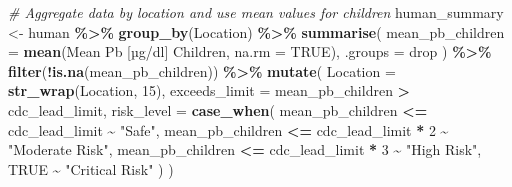 \documentclass[
]{article}
\newenvironment{Shaded}{\begin{snugshade}}{\end{snugshade}}
\newcommand{\AttributeTok}[1]{\textcolor[rgb]{0.13,0.29,0.53}{#1}}
\newcommand{\CommentTok}[1]{\textcolor[rgb]{0.56,0.35,0.01}{\textit{#1}}}
\newcommand{\ConstantTok}[1]{\textcolor[rgb]{0.56,0.35,0.01}{#1}}
\newcommand{\DecValTok}[1]{\textcolor[rgb]{0.00,0.00,0.81}{#1}}
\newcommand{\FunctionTok}[1]{\textcolor[rgb]{0.13,0.29,0.53}{\textbf{#1}}}
\newcommand{\NormalTok}[1]{#1}
\newcommand{\OtherTok}[1]{\textcolor[rgb]{0.56,0.35,0.01}{#1}}
\newcommand{\SpecialCharTok}[1]{\textcolor[rgb]{0.81,0.36,0.00}{\textbf{#1}}}
\newcommand{\StringTok}[1]{\textcolor[rgb]{0.31,0.60,0.02}{#1}}
\begin{document}
\begin{Shaded}
\begin{Highlighting}[]
\CommentTok{\# Aggregate data by location and use mean values for children}
\NormalTok{human\_summary }\OtherTok{\textless{}{-}}\NormalTok{ human }\SpecialCharTok{\%\textgreater{}\%}
  \FunctionTok{group\_by}\NormalTok{(Location) }\SpecialCharTok{\%\textgreater{}\%}
  \FunctionTok{summarise}\NormalTok{(}
    \AttributeTok{mean\_pb\_children =} \FunctionTok{mean}\NormalTok{(}\StringTok{\textasciigrave{}}\AttributeTok{Mean Pb [µg/dl] Children}\StringTok{\textasciigrave{}}\NormalTok{, }\AttributeTok{na.rm =} \ConstantTok{TRUE}\NormalTok{),}
    \AttributeTok{.groups =} \StringTok{\textquotesingle{}drop\textquotesingle{}}
\NormalTok{  ) }\SpecialCharTok{\%\textgreater{}\%}
  \FunctionTok{filter}\NormalTok{(}\SpecialCharTok{!}\FunctionTok{is.na}\NormalTok{(mean\_pb\_children)) }\SpecialCharTok{\%\textgreater{}\%}
  \FunctionTok{mutate}\NormalTok{(}
    \AttributeTok{Location =} \FunctionTok{str\_wrap}\NormalTok{(Location, }\DecValTok{15}\NormalTok{),}
    \AttributeTok{exceeds\_limit =}\NormalTok{ mean\_pb\_children }\SpecialCharTok{\textgreater{}}\NormalTok{ cdc\_lead\_limit,}
    \AttributeTok{risk\_level =} \FunctionTok{case\_when}\NormalTok{(}
\NormalTok{      mean\_pb\_children }\SpecialCharTok{\textless{}=}\NormalTok{ cdc\_lead\_limit }\SpecialCharTok{\textasciitilde{}} \StringTok{"Safe"}\NormalTok{,}
\NormalTok{      mean\_pb\_children }\SpecialCharTok{\textless{}=}\NormalTok{ cdc\_lead\_limit }\SpecialCharTok{*} \DecValTok{2} \SpecialCharTok{\textasciitilde{}} \StringTok{"Moderate Risk"}\NormalTok{,}
\NormalTok{      mean\_pb\_children }\SpecialCharTok{\textless{}=}\NormalTok{ cdc\_lead\_limit }\SpecialCharTok{*} \DecValTok{3} \SpecialCharTok{\textasciitilde{}} \StringTok{"High Risk"}\NormalTok{,}
      \ConstantTok{TRUE} \SpecialCharTok{\textasciitilde{}} \StringTok{"Critical Risk"}
\NormalTok{    )}
\NormalTok{  )}


\end{Highlighting}
\end{Shaded}
\end{document}
